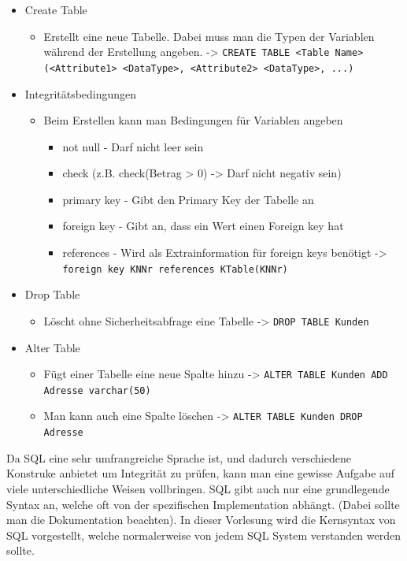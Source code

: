 \documentclass{article}
\begin{document}
 	\begin{itemize}
 		\item{Create Table}
 		\begin{itemize}
 			\item{Erstellt eine neue Tabelle. Dabei muss man die Typen der Variablen während der Erstellung angeben. -> \verb|CREATE TABLE <Table Name> (<Attribute1> <DataType>, <Attribute2> <DataType>, ...)|}
 		\end{itemize}
 		\item{Integritätsbedingungen}
 		\begin{itemize}
 			\item{Beim Erstellen kann man Bedingungen für Variablen angeben}
 			\begin{itemize}
 				\item{not null - Darf nicht leer sein}
 				\item{check (z.B. check(Betrag > 0) -> Darf nicht negativ sein)}
 				\item{primary key - Gibt den Primary Key der Tabelle an}
 				\item{foreign key - Gibt an, dass ein Wert einen Foreign key hat}
 				\item{references - Wird als Extrainformation für foreign keys benötigt -> \verb|foreign key KNNr references KTable(KNNr)|}
 			\end{itemize}
 		\end{itemize}
 		\item{Drop Table}
 		\begin{itemize}
 			\item{Löscht ohne Sicherheitsabfrage eine Tabelle -> \verb|DROP TABLE Kunden|}
 		\end{itemize}
 		\item{Alter Table}
 		\begin{itemize}
 			\item{Fügt einer Tabelle eine neue Spalte hinzu -> \verb|ALTER TABLE Kunden ADD Adresse varchar(50)|}
 			\item{Man kann auch eine Spalte löschen -> \verb|ALTER TABLE Kunden DROP Adresse|}
 		\end{itemize}
 	\end{itemize}
 	Da SQL eine sehr umfrangreiche Sprache ist, und dadurch verschiedene Konstruke anbietet um Integrität zu prüfen, kann man eine gewisse Aufgabe auf viele unterschiedliche Weisen vollbringen. SQL gibt auch nur eine grundlegende Syntax an, welche oft von der spezifischen Implementation abhängt. (Dabei sollte man die Dokumentation beachten). In dieser Vorlesung wird die Kernsyntax von SQL vorgestellt, welche normalerweise von jedem SQL System verstanden werden sollte. \\
\end{document}

